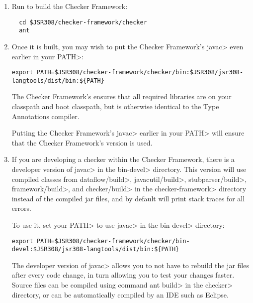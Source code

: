 \begin{enumerate}

\item
Run  to build the Checker Framework:

\begin{Verbatim}
  cd $JSR308/checker-framework/checker
  ant
\end{Verbatim}

\item
Once it is built, you may wish to put the Checker Framework's \<javac>
even earlier in your \<PATH>:

\begin{Verbatim}
export PATH=$JSR308/checker-framework/checker/bin:$JSR308/jsr308-langtools/dist/bin:${PATH}
\end{Verbatim}

The Checker Framework's  ensures that all required
libraries are on your classpath and boot classpath, but is otherwise
identical to the Type Annotations compiler.

Putting the Checker Framework's \<javac> earlier in your \<PATH> will
ensure that the Checker Framework's version is used.

\item
If you are developing a checker within the Checker Framework, there is
a developer version of \<javac> in the \<bin-devel> directory. This
version will use compiled classes from \<dataflow/build>,
\<javacutil/build>, \<stubparser/build>, \<framework/build>,
and \<checker/build> in the \<checker-framework> directory instead of
the compiled jar files, and by default will print stack traces for all
errors.

To use it, set your \<PATH> to use \<javac> in the \<bin-devel> directory:

\begin{Verbatim}
export PATH=$JSR308/checker-framework/checker/bin-devel:$JSR308/jsr308-langtools/dist/bin:${PATH}
\end{Verbatim}

The developer version of \<javac> allows you to not have to rebuild
the jar files after every code change, in turn allowing you to test
your changes faster. Source files can be compiled using command \<ant
build> in the \<checker> directory, or can be automatically compiled by
an IDE such as Eclipse.


\end{enumerate}
